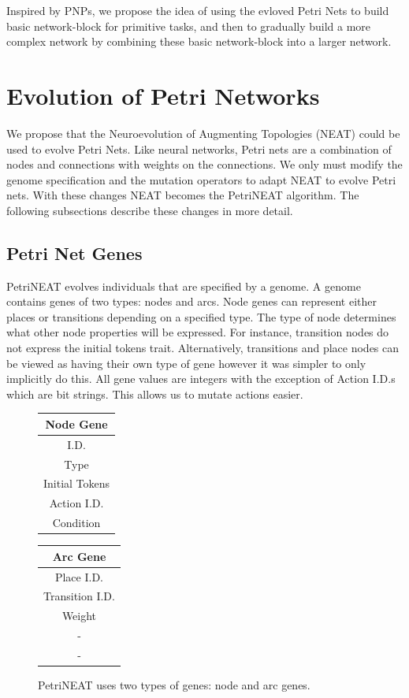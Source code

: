 \documentclass[12pt,a4paper,twocolumn]{article}
\begin{document}
Inspired by PNPs, we propose the idea of using the evloved Petri Nets to build basic network-block for primitive tasks, and then to gradually build a more complex network by combining these basic network-block into a larger network. 

\section{Evolution of Petri Networks}

We propose that the Neuroevolution of Augmenting Topologies (NEAT) could be used to evolve Petri Nets. Like neural networks, Petri nets are a combination of nodes and connections with weights on the connections. We only must modify the genome specification and the mutation operators to adapt NEAT to evolve Petri nets. With these changes NEAT becomes the PetriNEAT algorithm. The following subsections describe these changes in more detail.

\subsection{Petri Net Genes}

PetriNEAT evolves individuals that are specified by a genome. A genome contains genes of two types: nodes and arcs. Node genes can represent either places or transitions depending on a specified type. The type of node determines what other node properties will be expressed. For instance, transition nodes do not express the initial tokens trait. Alternatively, transitions and place nodes can be viewed as having their own type of gene however it was simpler to only implicitly do this. All gene values are integers with the exception of Action I.D.s which are bit strings. This allows us to mutate actions easier.

\begin{figure}
\centering
\begin{tabular}{|c|}
\hline
Node Gene\\ \hline
I.D. \\
Type \\
Initial Tokens \\
Action I.D. \\
Condition \\
\hline
\end{tabular}
\begin{tabular}{|c|}
\hline
Arc Gene\\ \hline
Place I.D.\\
Transition I.D.\\
Weight \\
 - \\
 -\\
\hline
\end{tabular}
\caption{PetriNEAT uses two types of genes: node and arc genes.}
\end{figure}
\end{document}
